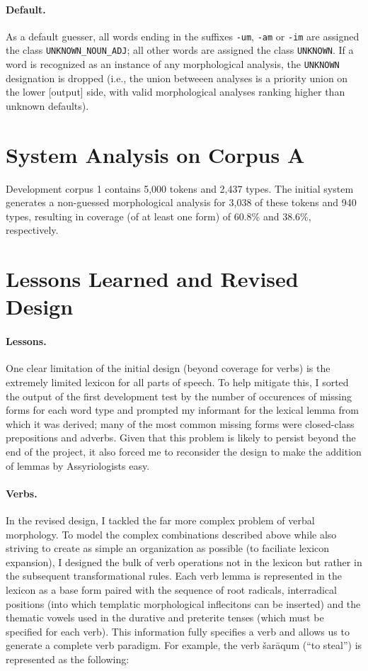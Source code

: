 \documentclass[11pt,letterpaper]{article}
\begin{document}
\paragraph{Default.}

As a default guesser, all words ending in the suffixes \texttt{-um}, \texttt{-am} or \texttt{-im} are assigned the class \texttt{UNKNOWN\_NOUN\_ADJ}; all other words are assigned the class \texttt{UNKNOWN}.  If a word is recognized as an instance of any morphological analysis, the \texttt{UNKNOWN} designation is dropped (i.e., the union betweeen analyses is a priority union on the lower [output] side, with valid morphological analyses ranking higher than unknown defaults). 

\section{System Analysis on Corpus A}

Development corpus 1 contains 5,000 tokens and 2,437 types.  The initial system generates a non-guessed morphological analysis for 3,038 of these tokens and 940 types, resulting in coverage (of at least one form) of 60.8\% and 38.6\%, respectively.

\section{Lessons Learned and Revised Design}

\paragraph{Lessons.}
One clear limitation of the initial design (beyond coverage for verbs) is the extremely limited lexicon for all parts of speech.  To help mitigate this, I sorted the output of the first development test by the number of occurences of missing forms for each word type and prompted my informant for the lexical lemma from which it was derived; many of the most common missing forms were closed-class prepositions and adverbs.  Given that this problem is likely to persist beyond the end of the project, it also forced me to reconsider the design to make the addition of lemmas by Assyriologists easy. 

\paragraph{Verbs.}
In the revised design, I tackled the far more complex problem of verbal morphology.
To model the complex combinations described above while also striving to create as simple an organization as possible (to faciliate lexicon expansion), I designed the bulk of verb operations not in the lexicon but rather in the subsequent transformational rules. Each verb lemma is represented in the lexicon as a base form paired with the sequence of root radicals, interradical positions (into which templatic morphological inflecitons can be inserted) and the thematic vowels used in the durative and preterite tenses (which must be specified for each verb).  This information fully specifies a verb and allows us to generate a complete verb paradigm.  For example, the verb šarāqum (``to steal'') is represented as the following:
\end{document}
